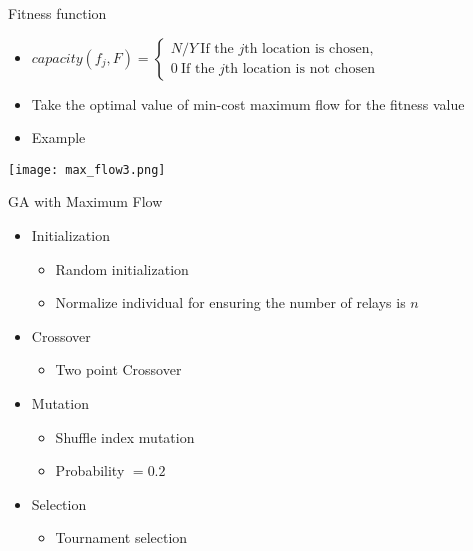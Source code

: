 \documentclass[main.tex]{subfiles}
\begin{document}
\begin{frame}{Fitness function}
	\begin{itemize}
		\item $capacity(f_j, F) = \begin{cases}
		N/Y ~ \text{If the $j$th location is chosen},\\
		0 ~ \text{If the $j$th location is not chosen}
		\end{cases}$
		\item Take the optimal value of min-cost maximum flow for the fitness value
		\item Example
	\end{itemize}
	\begin{center}
		\texttt{[image: max\_flow3.png]}
	\end{center}
\end{frame}



\begin{frame}{GA with Maximum Flow}
	\begin{itemize}
		\item Initialization
			\begin{itemize}
				\item Random initialization
				\item Normalize individual for ensuring the number of relays is $n$
			\end{itemize}
		\item Crossover
			\begin{itemize}
				\item Two point Crossover
			\end{itemize}
		\item Mutation
			\begin{itemize}
				\item Shuffle index mutation
				\item Probability $=0.2$
			\end{itemize}
		\item Selection
			\begin{itemize}
				\item Tournament selection
			\end{itemize}
	\end{itemize}
\end{frame}
\end{document}
